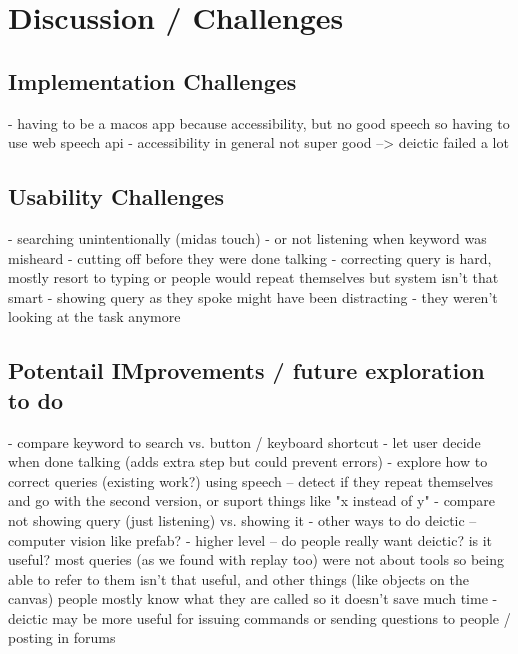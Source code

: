 \section{Discussion / Challenges}
\subsection{Implementation Challenges}
- having to be a macos app because accessibility, but no good speech so having to use web speech api
- accessibility in general not super good --> deictic failed a lot
\subsection{Usability Challenges}
- searching unintentionally (midas touch)
- or not listening when keyword was misheard
- cutting off before they were done talking
- correcting query is hard, mostly resort to typing or people would repeat themselves but system isn't that smart
- showing query as they spoke might have been distracting - they weren't looking at the task anymore
\subsection{Potentail IMprovements / future exploration to do}
- compare keyword to search vs. button / keyboard shortcut
- let user decide when done talking (adds extra step but could prevent errors)
- explore how to correct queries (existing work?) using speech -- detect if they repeat themselves and go with the second version, or suport things like "x instead of y"
- compare not showing query (just listening) vs. showing it
- other ways to do deictic -- computer vision like prefab?
- higher level -- do people really want deictic? is it useful? most queries (as we found with replay too) were not about tools so being able to refer to them isn't that useful, and other things (like objects on the canvas) people mostly know what they are called so it doesn't save much time
- deictic may be more useful for issuing commands or sending questions to people / posting in forums